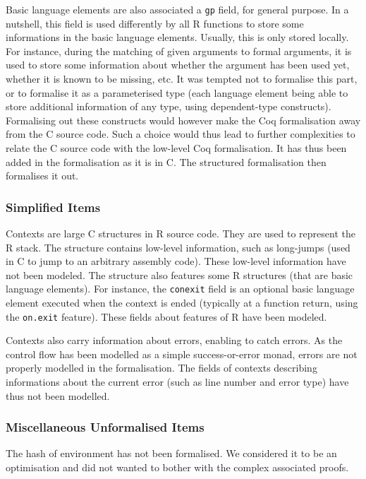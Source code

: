\documentclass{article}
\newcommand\Coq{Coq}
\newcommand\R{R}
\newcommand\Cn{C}
\begin{document}
Basic language elements are also associated a \texttt{gp} field,
for general purpose.
In a nutshell, this field is used differently by all \R{} functions
to store some informations in the basic language elements.
Usually, this is only stored locally.
For instance, during the matching of given arguments to formal arguments,
it is used to store some information about whether the argument
has been used yet, whether it is known to be missing, etc.
It was tempted not to formalise this part,
or to formalise it as a parameterised type
(each language element being able to store additional information
of any type, using dependent-type constructs).
Formalising out these constructs would however make the \Coq{}
formalisation away from the \Cn{} source code.
Such a choice would thus lead to further complexities to relate
the \Cn{} source code with the low-level \Coq{} formalisation.
It has thus been added in the formalisation as it is in \Cn{}.
The structured formalisation then formalises it out.


\subsubsection{Simplified Items}

Contexts are large \Cn{} structures in \R{} source code.
They are used to represent the \R{} stack.
The structure contains low-level information,
such as long-jumps
(used in \Cn{} to jump to an arbitrary assembly code).
These low-level information have not been modeled.
The structure also features some \R{} structures
(that are basic language elements).
For instance, the \texttt{conexit} field
is an optional basic language element executed when
the context is ended
(typically at a function return,
using the \texttt{on.exit} feature).
These fields about features of \R{} have been modeled.

Contexts also carry information about errors,
enabling to catch errors.
As the control flow has been modelled as a simple
success-or-error monad,
errors are not properly modelled in the formalisation.
The fields of contexts describing informations about
the current error
(such as line number and error type)
have thus not been modelled.


\subsubsection{Miscellaneous Unformalised Items}

The hash of environment has not been formalised.
We considered it to be an optimisation and did not wanted to bother
with the complex associated proofs.
\end{document}
